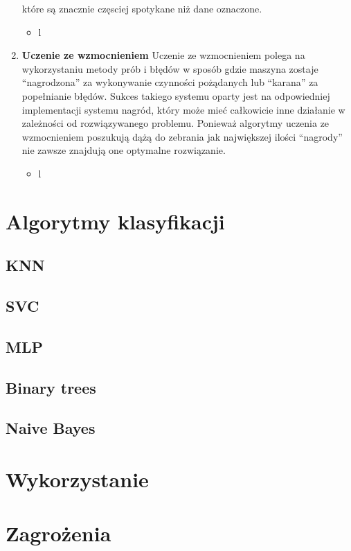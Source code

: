 \begin{enumerate}
    które są znacznie częsciej spotykane niż dane oznaczone. 
    \begin{itemize}
        \item l
    \end{itemize}
    \item \textbf{Uczenie ze wzmocnieniem}
    Uczenie ze wzmocnieniem polega na wykorzystaniu metody prób i błędów w sposób gdzie maszyna zostaje
    ``nagrodzona'' za wykonywanie czynności pożądanych lub ``karana'' za popełnianie błędów. 
    Sukces takiego systemu oparty jest na odpowiedniej implementacji systemu nagród, który może 
    mieć całkowicie inne działanie w zależności od rozwiązywanego problemu. 
    Ponieważ algorytmy uczenia ze wzmocnieniem poszukują dążą do zebrania jak największej
    ilości ``nagrody'' nie zawsze znajdują one optymalne rozwiązanie.
    \begin{itemize}
        \item l
    \end{itemize}
\end{enumerate} 
\section{Algorytmy klasyfikacji}
\subsection{KNN}
\subsection{SVC}
\subsection{MLP}
\subsection{Binary trees}
\subsection{Naive Bayes}
\section{Wykorzystanie}
\section{Zagrożenia}